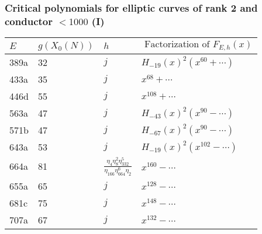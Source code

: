 \documentclass[handout]{beamer}
\begin{document}
\begin{frame}
\frametitle{Critical polynomials for elliptic curves of rank 2 and conductor $<1000$ (I)}
\begin{center}
   \begin{table}[h!]
    \begin{tabular}{ | l | l | l | |p{4.4cm}  |}
    \hline
    $E$ & $g(X_0(N))$    & $h$ & $\mbox{ Factorization of } F_{E,h}(x)$     \\ \hline \hline
    389a & 32  & $j$ & $H_{-19}(x)^2 (x^{60}+ \cdots)$ \\ \hline
    433a & 35  & $j$ &  $x^{68}+\cdots$  \\ \hline
     446d & 55  & $j$ &  $x^{108}+\cdots$ \\ \hline
    563a & 47  & $j$ &  $H_{-43}(x)^2 (x^{90} - \cdots)$   \\ \hline
    571b& 47  & $j$ &  $H_{-67}(x)^2 (x^{90} - \cdots)$ \\ \hline
    643a& 53  & $j$ &  $H_{-19}(x)^2 (x^{102} - \cdots)$ \\ \hline
    664a & 81    &   $\frac{\eta_4\eta_8^2 \eta_{332}^5}{\eta_{166}\eta_{664}^{6}{\eta_2}}$ & $x^{160} - \cdots$ \\ \hline
    655a& 65  & $j$ &  $x^{128} - \cdots$ \\  \hline
    681c& 75  & $j$ &  $x^{148} - \cdots$ \\  \hline
    707a & 67  & $j$ & $x^{132} - \cdots$ 
        \end{tabular}
    \label{table: rank two}	
   \end{table}
\end{center}


\end{frame}
 
\end{document}
